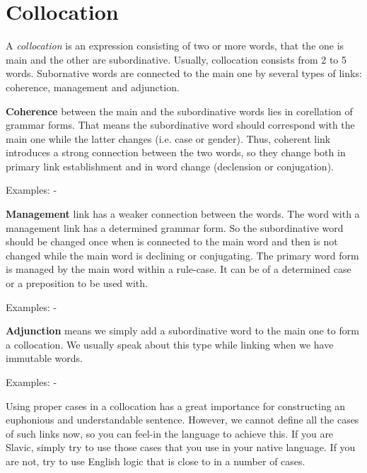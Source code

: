 \section{Collocation}

A \textit{collocation} is an expression consisting of two or more words, that the one is main and the other are subordinative. Usually, collocation consists from 2 to 5 words. Subornative words are connected to the main one by several types of links: coherence, management and adjunction.

\textbf{Coherence} between the main and the subordinative words lies in corellation of grammar forms. That means the subordinative word should correspond with the main one while the latter changes (i.e. case or gender). Thus, coherent link introduces a strong connection between the two words, so they change both in primary link establishment and in word change (declension or conjugation).

Examples:
- 

\textbf{Management} link has a weaker connection between the words. The word with a management link has a determined grammar form. So the subordinative word should be changed once when is connected to the main word and then is not changed while the main word is declining or conjugating. The primary word form is managed by the main word within a rule-case. It can be of a determined case or a preposition to be used with.

Examples:
- 

\textbf{Adjunction} means we simply add a subordinative word to the main one to form a collocation. We usually speak about this type while linking when we have immutable words.

Examples:
- 

Using proper cases in a collocation has a great importance for constructing an euphonious and understandable sentence. However, we cannot define all the cases of such links now, so you can feel-in the language to achieve this. If you are Slavic, simply try to use those cases that you use in your native language. If you are not, try to use English logic that is close to in a number of cases.
